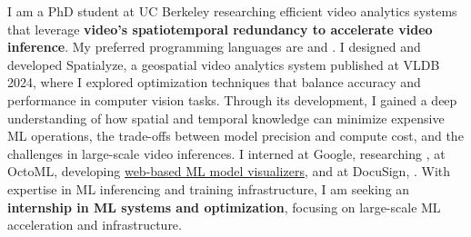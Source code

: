 \cvsummarysection


\begin{cvparagraph}

I am a PhD student at UC Berkeley researching efficient video analytics systems that leverage {\bf video's spatiotemporal redundancy to accelerate video inference}.
My preferred programming languages are \underline{} and \underline{}.
I designed and developed Spatialyze, a geospatial video analytics system published at VLDB 2024, where I explored optimization techniques that balance accuracy and performance in computer vision tasks.
Through its development, I gained a deep understanding of how spatial and temporal knowledge can minimize expensive ML operations, the trade-offs between model precision and compute cost, and the challenges in large-scale video inferences.
I interned
at Google, researching \underline{},
at OctoML, developing \underline{web-based ML model visualizers},
and at DocuSign, \underline{}.
With expertise in ML inferencing and training infrastructure, I am seeking an {\bf internship in ML systems and optimization}, focusing on large-scale ML acceleration and infrastructure.
\end{cvparagraph}
\vspace{-1mm}
